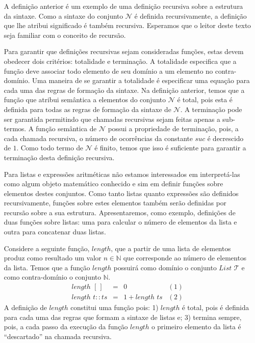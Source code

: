 A defini\c{c}\~ao anterior \'e um exemplo de uma defini\c{c}\~ao recursiva sobre a
estrutura da sintaxe. Como a sintaxe do conjunto $\mathcal{N}$ \'e definida recursivamente, a
defini\c{c}\~ao que lhe atribui significado \'e tamb\'em recursiva. Esperamos que o leitor deste texto
seja familiar com o conceito de recurs\~ao.

Para garantir que defini\c{c}\~oes recursivas sejam consideradas fun\c{c}\~oes, estas devem obedecer dois crit\'erios:
totalidade e termina\c{c}\~ao. A totalidade especifica que a fun\c{c}\~ao deve associar todo elemento de seu dom\'inio
a um elemento no contra-dom\'inio. Uma maneira de se garantir a totalidade \'e especificar uma equa\c{c}\~ao para cada uma
das regras de forma\c{c}\~ao da sintaxe. Na defini\c{c}\~ao anterior, temos que a fun\c{c}\~ao que atribui sem\^antica a
elementos do conjunto $\mathcal{N}$ \'e total, pois esta \'e definida para todas as regras de forma\c{c}\~ao da sintaxe de 
$\mathcal{N}$. A termina\c{c}\~ao pode ser garantida permitindo que chamadas recursivas sejam feitas apenas a sub-termos.
A fun\c{c}\~ao sem\^antica de $\mathcal{N}$ possui a propriedade de termina\c{c}\~ao, pois, a cada chamada recursiva, o 
n\'umero de ocorr\^encias da constante $suc$ \'e decrescido de $1$. Como todo termo de $\mathcal{N}$ \'e finito, temos que
isso \'e suficiente para garantir a termina\c{c}\~ao desta defini\c{c}\~ao recursiva.

Para listas e express\~oes aritm\'eticas n\~ao estamos interessados em interpret\'a-las como algum objeto matem\'atico conhecido
e sim em definir fun\c{c}\~oes sobre elementos destes conjuntos. Como tanto listas quanto express\~oes s\~ao definidos recursivamente,
fun\c{c}\~oes sobre estes elementos tamb\'em ser\~ao definidas por recurs\~ao sobre a sua estrutura. Apresentaremos, como exemplo, 
defini\c{c}\~oes de duas fun\c{c}\~oes sobre listas: uma para calcular o n\'umero de elementos da lista e outra para concatenar duas listas.

\begin{Definition}
Considere a seguinte fun\c{c}\~ao, $length$, que a partir de uma lista de elementos produz como resultado um valor $n\in\mathbb{N}$ que
corresponde ao n\'umero de elementos da lista. Temos que a fun\c{c}\~ao $length$ possuir\'a como dom\'inio o conjunto $\textit{List }\mathcal{T}$
e como contra-dom\'inio o conjunto $\mathbb{N}$.
\[
\begin{array}{lclr}
  length\,\,[\,] & = & 0 & (1)\\
  length\,\,t :: ts & = & 1 + length\,\, ts & (2)
\end{array}
\]
A defini\c{c}\~ao de $length$ constitui uma fun\c{c}\~ao pois: 1) $length$ \'e total, pois \'e definida para cada uma das regras que formam
a sintaxe de listas e; 3) termina sempre, pois, a cada passo da execu\c{c}\~ao da fun\c{c}\~ao $length$ o primeiro elemento da lista \'e
``descartado'' na chamada recursiva.
\end{Definition}

